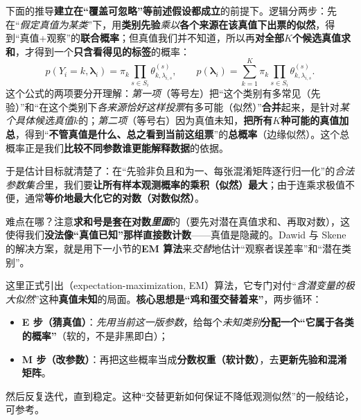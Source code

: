 下面的推导\textbf{建立在“覆盖可忽略”等前述假设都成立}的前提下。逻辑分两步：先在“\emph{假定真值为某类}”下，用\textbf{类别先验}\emph{乘以}\textbf{各个来源在该真值下出票的似然}，得到“真值+观察”的\textbf{联合概率}；但真值我们并不知道，所以再\textbf{对全部$K$个候选真值求和}，才得到一个\textbf{只含看得见的标签}的概率：
\begin{equation}
  p(Y_i=k,\bm{\lambda}_i)
  =\pi_k\prod_{s\in S_i}\theta^{(s)}_{k,\lambda_{i,s}},
  \qquad
  p(\bm{\lambda}_i)
  =\sum_{k=1}^{K}\pi_k
    \prod_{s\in S_i}\theta^{(s)}_{k,\lambda_{i,s}}.
  \label{eq:knowledge-fusion-dawid-skene}
\end{equation}
这个公式的两项要分开理解：\emph{第一项}（等号左）把“这个类别有多常见（先验）”和“在这个类别下\emph{各来源恰好这样投票}有多可能（似然）”\textbf{合并}起来，是针对\emph{某个具体候选真值}$k$的；\emph{第二项}（等号右）因为真值未知，\textbf{把所有$K$种可能的真值加总}，得到“\textbf{不管真值是什么、总之看到当前这组票}”的\textbf{总概率}（边缘似然）。这个总概率正是我们\textbf{比较不同参数谁更能解释数据}的依据。

于是估计目标就清楚了：在“先验非负且和为一、每张混淆矩阵逐行归一化”的\emph{合法参数集合}里，我们要\textbf{让所有样本观测概率的乘积（似然）最大}；由于连乘求极值不便，通常\textbf{等价地最大化它的对数（对数似然）}。

难点在哪？注意\textbf{求和号是套在对数\emph{里面}}的（要先对潜在真值求和、再取对数），这使得我们\textbf{没法像“真值已知”那样直接数计数}——真值是隐藏的。Dawid 与 Skene 的解决方案，就是用下一小节的\textbf{EM 算法}来\emph{交替}地估计“观察者误差率”和“潜在类别”。

这里正式引出（expectation-maximization, EM）算法，它专门对付“\emph{含潜变量的极大似然}”这种\textbf{真值未知}的局面。\textbf{核心思想是“鸡和蛋交替着来”}，两步循环：
\begin{itemize}\item \textbf{E 步（猜真值）}：\emph{先用当前这一版参数}，给每个\emph{未知类别}\textbf{分配一个“它属于各类的概率”}（软的，不是非黑即白）；\item \textbf{M 步（改参数）}：再把这些概率当成\textbf{分数权重（软计数）}，去\textbf{更新先验和混淆矩阵}。\end{itemize}
然后反复迭代，直到稳定。这种“交替更新如何保证不降低观测似然”的一般结论，可参考。

